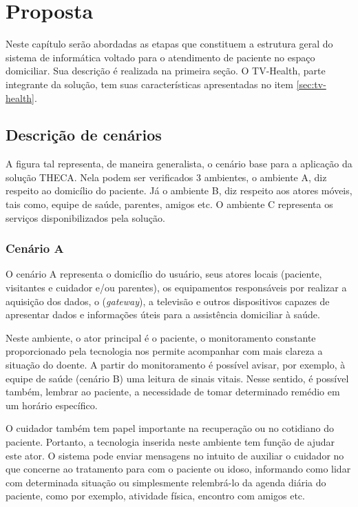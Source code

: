 \chapter{Proposta}\label{cap:proposta}

Neste capítulo serão abordadas as etapas que constituem a estrutura geral do
sistema de informática voltado para o atendimento de paciente no espaço domiciliar. 
Sua descrição é realizada na primeira seção. O TV-Health, parte integrante da 
solução, tem suas características apresentadas no item \ref{sec:tv-health}.

\section{Descrição de cenários}

A figura tal representa, de maneira generalista, o cenário base para a aplicação
da solução THECA. Nela podem ser verificados 3 ambientes, o ambiente A, diz
respeito ao domicílio do paciente. Já o ambiente B, diz respeito aos atores
móveis, tais como, equipe de saúde, parentes, amigos etc. O ambiente C
representa os serviços disponibilizados pela solução.

\subsection{Cenário A} \label{subsec:cenario-a}

O cenário A representa o domicílio do usuário, seus atores locais (paciente,
visitantes e cuidador e/ou parentes), os equipamentos responsáveis por 
realizar a aquisição dos dados, o \stb[] (\textit{gateway}), a televisão e outros
dispositivos capazes de apresentar dados e informações úteis para a assistência
domiciliar à saúde. 

Neste ambiente, o ator principal é o paciente, o monitoramento constante 
proporcionado pela tecnologia nos permite acompanhar com mais clareza a situação
do doente. A partir do monitoramento é possível avisar, por exemplo, à equipe
de saúde (cenário B) uma leitura de sinais vitais. Nesse sentido, é possível 
também, lembrar ao paciente, a necessidade de tomar determinado remédio em um
horário específico.

O cuidador também tem papel importante na recuperação ou no cotidiano do 
paciente. Portanto, a tecnologia inserida neste ambiente tem função de ajudar
este ator. O sistema pode enviar mensagens no intuito de auxiliar o cuidador no
que concerne ao tratamento para com o paciente ou idoso, informando como lidar
com determinada situação ou simplesmente relembrá-lo da agenda diária do 
paciente, como por exemplo, atividade física, encontro com amigos etc.

